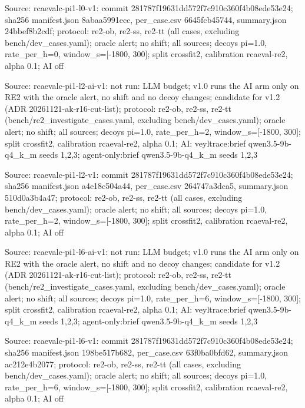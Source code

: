 \noindent Source: rcaevalc-pi1-l0-v1: commit 281787f19631dd572f7c910c360f4b08ede53e24; sha256 manifest.json 8abaa5991ecc, per\_case.csv 6645fcb45744, summary.json 24bbef8b2cdf; protocol: re2-ob, re2-ss, re2-tt (all cases, excluding bench/\allowbreak{}dev\_cases.yaml); oracle alert; no shift; all sources; decoys pi=1.0, rate\_per\_h=0, window\_s=[-1800, 300]; split crossfit2, calibration rcaeval-re2, alpha 0.1; AI off\par
\noindent Source: rcaevalc-pi1-l2-ai-v1: not run: LLM budget; v1.0 runs the AI arm only on RE2 with the oracle alert, no shift and no decoy changes; candidate for v1.2 (ADR 20261121-ak-r16-cut-list); protocol: re2-ob, re2-ss, re2-tt (bench/\allowbreak{}re2\_investigate\_cases.yaml, excluding bench/\allowbreak{}dev\_cases.yaml); oracle alert; no shift; all sources; decoys pi=1.0, rate\_per\_h=2, window\_s=[-1800, 300]; split crossfit2, calibration rcaeval-re2, alpha 0.1; AI: veyltrace:brief qwen3.5-9b-q4\_k\_m seeds 1,2,3; agent-only:brief qwen3.5-9b-q4\_k\_m seeds 1,2,3\par
\noindent Source: rcaevalc-pi1-l2-v1: commit 281787f19631dd572f7c910c360f4b08ede53e24; sha256 manifest.json a4e18c504a44, per\_case.csv 264747a3dca5, summary.json 510d0a3b4a47; protocol: re2-ob, re2-ss, re2-tt (all cases, excluding bench/\allowbreak{}dev\_cases.yaml); oracle alert; no shift; all sources; decoys pi=1.0, rate\_per\_h=2, window\_s=[-1800, 300]; split crossfit2, calibration rcaeval-re2, alpha 0.1; AI off\par
\noindent Source: rcaevalc-pi1-l6-ai-v1: not run: LLM budget; v1.0 runs the AI arm only on RE2 with the oracle alert, no shift and no decoy changes; candidate for v1.2 (ADR 20261121-ak-r16-cut-list); protocol: re2-ob, re2-ss, re2-tt (bench/\allowbreak{}re2\_investigate\_cases.yaml, excluding bench/\allowbreak{}dev\_cases.yaml); oracle alert; no shift; all sources; decoys pi=1.0, rate\_per\_h=6, window\_s=[-1800, 300]; split crossfit2, calibration rcaeval-re2, alpha 0.1; AI: veyltrace:brief qwen3.5-9b-q4\_k\_m seeds 1,2,3; agent-only:brief qwen3.5-9b-q4\_k\_m seeds 1,2,3\par
\noindent Source: rcaevalc-pi1-l6-v1: commit 281787f19631dd572f7c910c360f4b08ede53e24; sha256 manifest.json 198be517b682, per\_case.csv 63f0ba0bfd62, summary.json ac212e4b2077; protocol: re2-ob, re2-ss, re2-tt (all cases, excluding bench/\allowbreak{}dev\_cases.yaml); oracle alert; no shift; all sources; decoys pi=1.0, rate\_per\_h=6, window\_s=[-1800, 300]; split crossfit2, calibration rcaeval-re2, alpha 0.1; AI off\par
